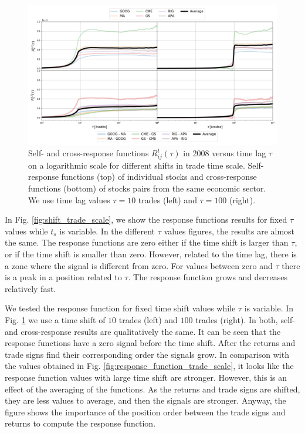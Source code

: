 \begin{figure}[htbp]
    \centering
    \includegraphics[width=\textwidth]{figures/04_shift_responses_trade.png}
    \caption{Self- and cross-response functions $R^{t}_{ij}\left(\tau\right)$
             in 2008 versus time lag $\tau$ on a logarithmic scale for
             different shifts in trade time scale. Self-response functions
             (top) of individual stocks and cross-response functions (bottom)
             of stocks pairs from the same economic sector. We use time lag
             values $\tau=10$ trades (left) and $\tau=100$ (right).}
    \label{fig:shift_responses_trade_scale}
\end{figure}

In Fig. \ref{fig:shift_trade_scale}, we show the response functions results for
fixed $\tau$ values while $t_{s}$ is variable. In the different $\tau$ values
figures, the results are almost the same. The response functions are zero
either if the time shift is larger than $\tau$, or if the time shift is smaller
than zero. However, related to the time lag, there is a zone where the signal
is different from zero. For values between zero and $\tau$ there is a peak in a
position related to $\tau$. The response function grows and decreases
relatively fast.

We tested the response function for fixed time shift values while $\tau$ is
variable. In Fig. \ref{fig:shift_responses_trade_scale} we use a time shift of
$10$ trades (left) and $100$ trades (right). In both, self- and cross-response
results are qualitatively the same. It can be seen that the response functions
have a zero signal before the time shift. After the returns and trade signs
find their corresponding order the signals grow. In comparison with the values
obtained in Fig. \ref{fig:response_function_trade_scale}, it looks like the
response function values with large time shift are stronger. However, this is
an effect of the averaging of the functions. As the returns and trade signs are
shifted, they are less values to average, and then the signals are stronger.
Anyway, the figure shows the importance of the position order between the trade
signs and returns to compute the response function.

